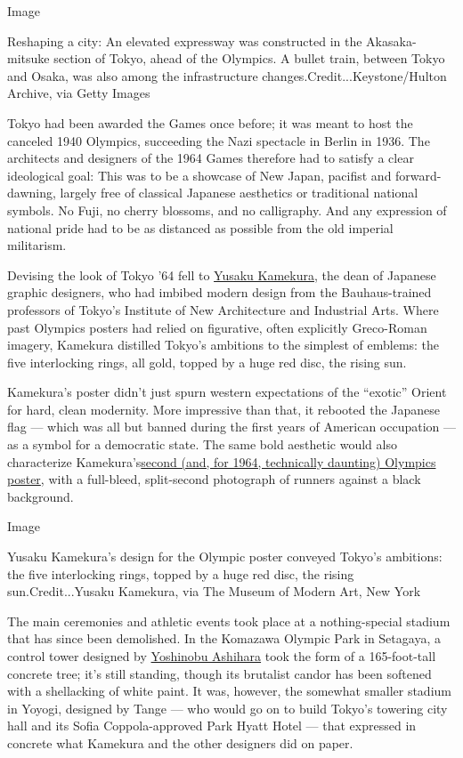 Image

Reshaping a city: An elevated expressway was constructed in the
Akasaka-mitsuke section of Tokyo, ahead of the Olympics. A bullet train,
between Tokyo and Osaka, was also among the infrastructure
changes.Credit...Keystone/Hulton Archive, via Getty Images

Tokyo had been awarded the Games once before; it was meant to host the
canceled 1940 Olympics, succeeding the Nazi spectacle in Berlin in 1936.
The architects and designers of the 1964 Games therefore had to satisfy
a clear ideological goal: This was to be a showcase of New Japan,
pacifist and forward-dawning, largely free of classical Japanese
aesthetics or traditional national symbols. No Fuji, no cherry blossoms,
and no calligraphy. And any expression of national pride had to be as
distanced as possible from the old imperial militarism.

Devising the look of Tokyo '64 fell to
\href{http://adcglobal.org/hall-of-fame/yusaku-kamekura/}{Yusaku
Kamekura}, the dean of Japanese graphic designers, who had imbibed
modern design from the Bauhaus-trained professors of Tokyo's Institute
of New Architecture and Industrial Arts. Where past Olympics posters had
relied on figurative, often explicitly Greco-Roman imagery, Kamekura
distilled Tokyo's ambitions to the simplest of emblems: the five
interlocking rings, all gold, topped by a huge red disc, the rising sun.

Kamekura's poster didn't just spurn western expectations of the
``exotic'' Orient for hard, clean modernity. More impressive than that,
it rebooted the Japanese flag --- which was all but banned during the
first years of American occupation --- as a symbol for a democratic
state. The same bold aesthetic would also characterize
Kamekura's\href{https://www.moma.org/collection/works/8783}{second (and,
for 1964, technically daunting) Olympics poster}, with a full-bleed,
split-second photograph of runners against a black background.

Image

Yusaku Kamekura's design for the Olympic poster conveyed Tokyo's
ambitions: the five interlocking rings, topped by a huge red disc, the
rising sun.Credit...Yusaku Kamekura, via The Museum of Modern Art, New
York

The main ceremonies and athletic events took place at a nothing-special
stadium that has since been demolished. In the Komazawa Olympic Park in
Setagaya, a control tower designed by
\href{https://www.timeout.com/tokyo/art/the-yoshinobu-ashihara-architectural-archives-dreaming-modernism}{Yoshinobu
Ashihara} took the form of a 165-foot-tall concrete tree; it's still
standing, though its brutalist candor has been softened with a
shellacking of white paint. It was, however, the somewhat smaller
stadium in Yoyogi, designed by Tange --- who would go on to build
Tokyo's towering city hall and its Sofia Coppola-approved Park Hyatt
Hotel --- that expressed in concrete what Kamekura and the other
designers did on paper.

